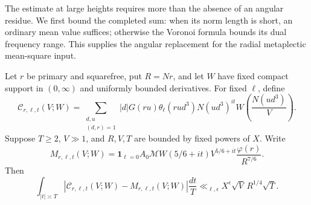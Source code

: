 The estimate at large heights requires more than the absence of an
angular residue. We first bound the completed sum: when its norm
length is short, an ordinary mean value suffices; otherwise the
Voronoi formula bounds its dual frequency range. This supplies the
angular replacement for the radial metaplectic mean-square input.

\begin{lemma}
\label{lem:angular-completed-height}
Let $r$ be primary and squarefree, put $R=Nr$, and let $W$ have
fixed compact support in $(0,\infty)$ and uniformly bounded
derivatives. For fixed $\ell$, define
\[
 \mathcal C_{r,\ell,t}(V;W)=
 \sum_{\substack{d,u\\(d,r)=1}}|d|G(ru)
       \theta_\ell(rud^3)N(ud^3)^{it}
       W\left(\frac{N(ud^3)}V\right).
\]
Suppose $T\ge2$, $V\gg1$, and $R,V,T$ are bounded by fixed
powers of $X$. Write
\[
 M_{r,\ell,t}(V;W)=
 \boldsymbol1_{\ell=0}A_0\mathcal MW(5/6+it)V^{5/6+it}
                   \frac{\varphi(r)}{R^{7/6}}.
\]
Then
\begin{equation}
 \int_{|t|\asymp T}
       |\mathcal C_{r,\ell,t}(V;W)-M_{r,\ell,t}(V;W)|
           \frac{dt}T
 \ll_{\ell,\epsilon}X^\epsilon\sqrt V\,R^{1/4}\sqrt T.
 \label{eq:angular-completed-height}
\end{equation}
\end{lemma}

